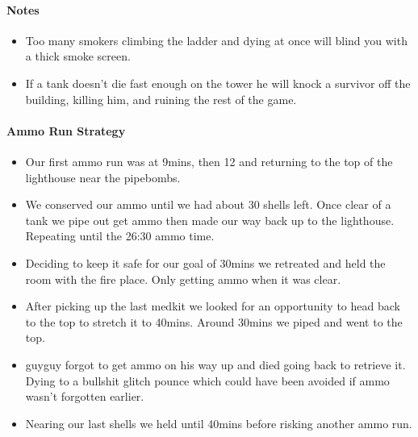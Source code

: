 \paragraph{Notes}
\begin{itemize}
\item Too many smokers climbing the ladder and dying at once will blind you with a thick smoke screen.
\item If a tank doesn’t die fast enough on the tower he will knock a survivor off the building, killing him, and ruining the rest of the game.
\end{itemize}

\paragraph{Ammo Run Strategy}
\begin{itemize}
\item Our first ammo run was at 9mins, then 12 and returning to the top of the lighthouse near the pipebombs.
\item We conserved our ammo until we had about 30 shells left. Once clear of a tank we pipe out get ammo then made our way back up to the lighthouse. Repeating until the 26:30 ammo time.
\item Deciding to keep it safe for our goal of 30mins we retreated and held the room with the fire place. Only getting ammo when it was clear.
\item After picking up the last medkit we looked for an opportunity to head back to the top to stretch it to 40mins. Around 30mins we piped and went to the top.
\item guyguy forgot to get ammo on his way up and died going back to retrieve it. Dying to a bullshit glitch pounce which could have been avoided if ammo wasn’t forgotten earlier.
\item Nearing our last shells we held until 40mins before risking another ammo run.
\end{itemize}
